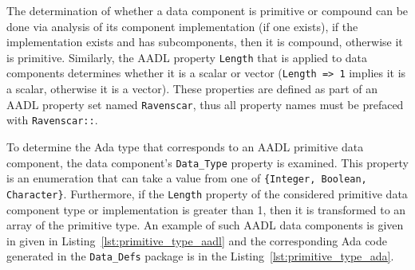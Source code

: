 The determination of whether a data component is primitive or compound
can be done via analysis of its component implementation (if one
exists), if the implementation exists and has subcomponents, then it
is compound, otherwise it is primitive. Similarly, the AADL property
\texttt{Length} that is applied to data components determines whether
it is a scalar or vector (\texttt{Length => 1} implies it is a scalar,
otherwise it is a vector). These properties are defined as part of an
AADL property set named \texttt{Ravenscar}, thus all property names
must be prefaced with \texttt{Ravenscar::}.

To determine the Ada type that corresponds to an AADL primitive data
component, the data component's \texttt{Data\_Type} property is
examined. This property is an enumeration that can take a value from
one of \texttt{\{Integer, Boolean, Character\}}. Furthermore, if the
\texttt{Length} property of the considered primitive data component
type or implementation is greater than 1, then it is transformed to an
array of the primitive type. An example of such AADL data components
is given in given in Listing~\ref{lst:primitive_type_aadl} and the
corresponding Ada code generated in the \texttt{Data\_Defs} package is
in the Listing~\ref{lst:primitive_type_ada}.

